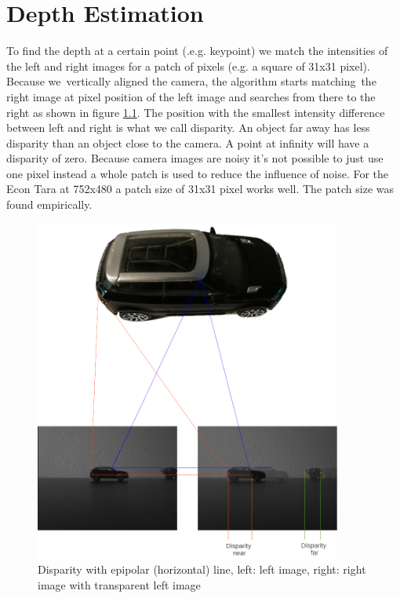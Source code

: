 \documentclass[11pt,a4paper,titlepage,oneside]{report}
\begin{document}
\chapter{Depth Estimation}\label{ch:depth}

To find the depth at a certain point (.e.g. keypoint) we match the intensities of the left and right images for a patch of pixels (e.g. a square of 31x31 pixel). Because we vertically aligned the camera, the algorithm starts matching the right image at pixel position of the left image and searches from there to the right as shown in figure \ref{fig:disparity}. The position with the smallest intensity difference between left and right is what we call disparity. An object far away has less disparity than an object close to the camera. A point at infinity will have a disparity of zero. Because camera images are noisy it's not possible to just use one pixel instead a whole patch is used to reduce the influence of noise. For the Econ Tara at 752x480 a patch size of 31x31 pixel works well. The patch size was found empirically.

\begin{figure}[H]
  \begin{center}
    \includegraphics[width=0.9\textwidth]{img/disparity_concept.png}
  \end{center}
  \caption{Disparity with epipolar (horizontal) line, left: left image, right: right image with transparent left image}\label{fig:disparity}
\end{figure}
\end{document}
